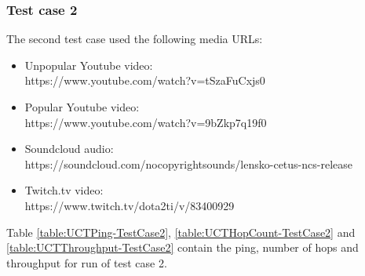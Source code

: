 \documentclass{sig-alternate-05-2015}
\begin{document}
\begin{table}
	\centering
	\caption{Throughput using UCT network - Test 1}
	\label{table:UCTThroughput-TestCase1}
\end{table}

\subsubsection{Test case 2}
The second test case used the following media URLs:
\begin{itemize}
	\item Unpopular Youtube video: \\ 
	https://www.youtube.com/watch?v=tSzaFuCxjs0
	\item Popular Youtube video: \\
	https://www.youtube.com/watch?v=9bZkp7q19f0
	\item Soundcloud audio: \\ https://soundcloud.com/nocopyrightsounds/lensko-cetus-ncs-release
	\item Twitch.tv video: \\ https://www.twitch.tv/dota2ti/v/83400929
\end{itemize}
Table \ref{table:UCTPing-TestCase2}, \ref{table:UCTHopCount-TestCase2} and \ref{table:UCTThroughput-TestCase2} contain the ping, number of hops and throughput for run of test case 2.
\end{document}
